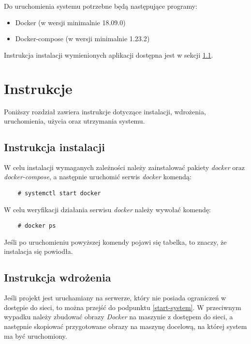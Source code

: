 \documentclass[a4paper,11pt,twoside]{report}
\theoremstyle{definition}
\begin{document}
        Do uruchomienia systemu potrzebne będą następujące programy:
        
        \begin{itemize}
            \item Docker (w wersji minimalnie 18.09.0)
            \item Docker-compose (w wersji minimalnie 1.23.2)
        \end{itemize}
    
        Instrukcja instalacji wymienionych aplikacji dostępna jest w sekcji \ref{installation-instruction}.
    
    \section{Instrukcje}
        Poniższy rozdział zawiera instrukcje dotyczące instalacji, wdrożenia, uruchomienia, użycia oraz utrzymania systemu.
    
    \subsection{Instrukcja instalacji}
        \label{installation-instruction}
        W celu instalacji wymaganych zależności należy zainstalować pakiety \textit{docker} oraz \textit{docker-compose}, a następnie uruchomić serwis \textit{docker} komendą:

        \begin{verbatim}
    # systemctl start docker
        \end{verbatim}

        W celu weryfikacji działania serwisu \textit{docker} należy wywołać komendę:
        \begin{verbatim}
    # docker ps
        \end{verbatim}

        Jeśli po uruchomieniu powyższej komendy pojawi się tabelka, to znaczy, że instalacja się powiodła.

    \subsection{Instrukcja wdrożenia}
    
        Jeśli projekt jest uruchamiany na serwerze, który nie posiada ograniczeń w dostępie do sieci, to można przejść do podpunktu \ref{start-system}. W przeciwnym wypadku należy zbudować obrazy \textit{Docker} na maszynie z dostępem do sieci, a następnie skopiować przygotowane obrazy na maszynę docelową, na której system ma być uruchomiony.
        
\end{document}
